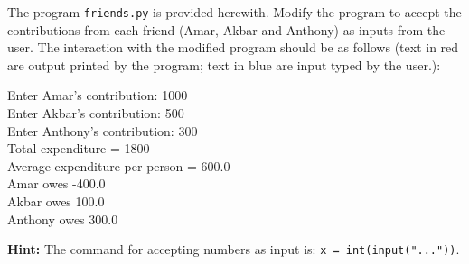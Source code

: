\documentclass[addpoints,11pt]{exam}
\begin{document}
\begin{questions}
\question
The program \texttt{friends.py} is provided herewith. Modify the program to accept the contributions from each friend (Amar, Akbar and Anthony) as inputs from the user. The interaction with the modified program should be as follows (text in {\color{Red}red} are output printed by the program; text in {\color{Blue}blue} are input typed by the user.):

{\color{Red}Enter Amar's contribution:} {\color{Blue}1000} \\
{\color{Red}Enter Akbar's contribution:} {\color{Blue}500} \\
{\color{Red}Enter Anthony's contribution:} {\color{Blue}300} \\
{\color{Red}Total expenditure =  1800} \\
{\color{Red}Average expenditure per person =  600.0} \\
{\color{Red}Amar owes  -400.0} \\
{\color{Red}Akbar owes  100.0} \\
{\color{Red}Anthony owes  300.0} 
 
\textbf{Hint:} The command for accepting numbers as input is: \lstinline[style=pc]@x = int(input("..."))@.
\end{questions}
\end{document}
